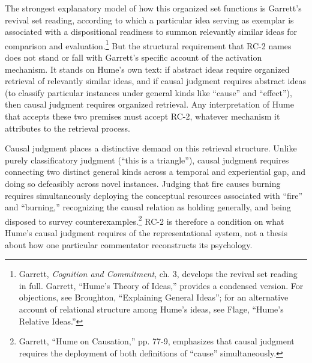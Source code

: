 \documentclass[11pt]{article}
\begin{document}
The strongest explanatory model of how this organized set functions is Garrett's revival set reading, according to which a particular idea serving as exemplar is associated with a dispositional readiness to summon relevantly similar ideas for comparison and evaluation.\footnote{Garrett, \emph{Cognition and Commitment}, ch. 3, develops the revival set reading in full. Garrett, ``Hume's Theory of Ideas,'' provides a condensed version. For objections, see Broughton, ``Explaining General Ideas''; for an alternative account of relational structure among Hume's ideas, see Flage, ``Hume's Relative Ideas.''} But the structural requirement that RC-2 names does not stand or fall with Garrett's specific account of the activation mechanism. It stands on Hume's own text: if abstract ideas require organized retrieval of relevantly similar ideas, and if causal judgment requires abstract ideas (to classify particular instances under general kinds like ``cause'' and ``effect''), then causal judgment requires organized retrieval. Any interpretation of Hume that accepts these two premises must accept RC-2, whatever mechanism it attributes to the retrieval process.

Causal judgment places a distinctive demand on this retrieval structure. Unlike purely classificatory judgment (``this is a triangle''), causal judgment requires connecting two distinct general kinds across a temporal and experiential gap, and doing so defeasibly across novel instances. Judging that fire causes burning requires simultaneously deploying the conceptual resources associated with ``fire'' and ``burning,'' recognizing the causal relation as holding generally, and being disposed to survey counterexamples.\footnote{Garrett, ``Hume on Causation,'' pp. 77-9, emphasizes that causal judgment requires the deployment of both definitions of ``cause'' simultaneously.} RC-2 is therefore a condition on what Hume's causal judgment requires of the representational system, not a thesis about how one particular commentator reconstructs its psychology.
\end{document}
